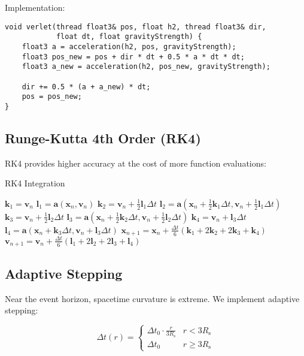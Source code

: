 \documentclass[12pt,a4paper]{article}
\theoremstyle{definition}
\theoremstyle{remark}
\newcommand{\Rs}{R_{\text{s}}}
\begin{document}
Implementation:

\begin{lstlisting}[style=metalstyle, caption=Verlet integration in Metal]
void verlet(thread float3& pos, float h2, thread float3& dir, 
            float dt, float gravityStrength) {
    float3 a = acceleration(h2, pos, gravityStrength);
    float3 pos_new = pos + dir * dt + 0.5 * a * dt * dt;
    float3 a_new = acceleration(h2, pos_new, gravityStrength);
    
    dir += 0.5 * (a + a_new) * dt;
    pos = pos_new;
}
\end{lstlisting}

\subsection{Runge-Kutta 4th Order (RK4)}

RK4 provides higher accuracy at the cost of more function evaluations:

\begin{algorithm}
\caption{RK4 Integration}
\begin{algorithmic}
\STATE $\mathbf{k}_1 = \mathbf{v}_n$
\STATE $\mathbf{l}_1 = \mathbf{a}(\mathbf{x}_n, \mathbf{v}_n)$
\STATE $\mathbf{k}_2 = \mathbf{v}_n + \frac{1}{2}\mathbf{l}_1 \Delta t$
\STATE $\mathbf{l}_2 = \mathbf{a}(\mathbf{x}_n + \frac{1}{2}\mathbf{k}_1 \Delta t, \mathbf{v}_n + \frac{1}{2}\mathbf{l}_1 \Delta t)$
\STATE $\mathbf{k}_3 = \mathbf{v}_n + \frac{1}{2}\mathbf{l}_2 \Delta t$
\STATE $\mathbf{l}_3 = \mathbf{a}(\mathbf{x}_n + \frac{1}{2}\mathbf{k}_2 \Delta t, \mathbf{v}_n + \frac{1}{2}\mathbf{l}_2 \Delta t)$
\STATE $\mathbf{k}_4 = \mathbf{v}_n + \mathbf{l}_3 \Delta t$
\STATE $\mathbf{l}_4 = \mathbf{a}(\mathbf{x}_n + \mathbf{k}_3 \Delta t, \mathbf{v}_n + \mathbf{l}_3 \Delta t)$
\STATE $\mathbf{x}_{n+1} = \mathbf{x}_n + \frac{\Delta t}{6}(\mathbf{k}_1 + 2\mathbf{k}_2 + 2\mathbf{k}_3 + \mathbf{k}_4)$
\STATE $\mathbf{v}_{n+1} = \mathbf{v}_n + \frac{\Delta t}{6}(\mathbf{l}_1 + 2\mathbf{l}_2 + 2\mathbf{l}_3 + \mathbf{l}_4)$
\end{algorithmic}
\end{algorithm}

\subsection{Adaptive Stepping}

Near the event horizon, spacetime curvature is extreme. We implement adaptive stepping:

\begin{equation}
    \Delta t(r) = \begin{cases}
        \Delta t_0 \cdot \frac{r}{3\Rs} & r < 3\Rs \\
        \Delta t_0 & r \geq 3\Rs
    \end{cases}
\end{equation}
\end{document}
